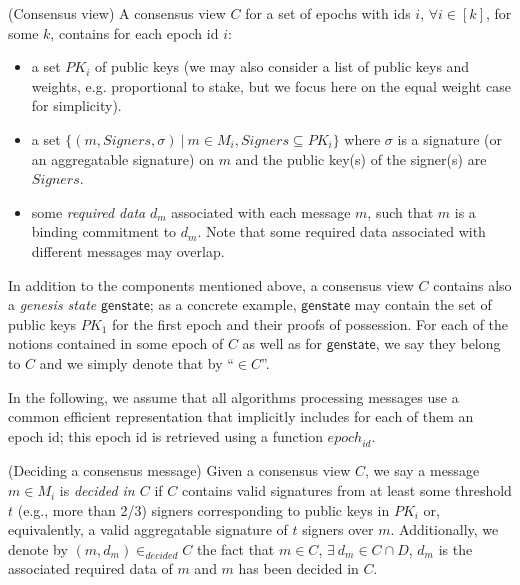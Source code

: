 \begin{dfn}(Consensus view) A consensus view $C$ for a set of epochs with ids $i$, $\forall i \in [k]$, 
for some $k$, contains for each epoch id $i$:
\begin{itemize}
\item a set $PK_i$ of public keys (we may also consider a list of public keys and weights, e.g. proportional to stake, but we focus here on  
the equal weight case for simplicity). 
\item a set $\{(m, \mathit{Signers}, \sigma) \ | \ m \in M_i, \mathit{Signers} \subseteq PK_i\}$ where 
$\sigma$ is a signature (or an aggregatable signature) on $m$ and the public key(s) of the signer(s) are $\mathit{Signers}$. 
\item some \textit{required data} $d_{m}$ associated with each message $m$, such that $m$ is a binding commitment to $d_{m}$. Note 
that some required data associated with different messages may overlap. 
\end{itemize}
In addition to the components mentioned above, a consensus view $C$ contains also a \emph{genesis state} $\mathsf{genstate}$; as a concrete example,
$\mathsf{genstate}$ may contain the set of public keys $\mathit{PK_1}$ for the first epoch and their proofs of possession. For each of the notions 
contained in some epoch of $C$ as well as for $\mathsf{genstate}$, we say they belong to $C$ and we simply denote that by ``$\in C$''. 
\end{dfn}

\noindent In the following, we assume that all algorithms processing messages use a common efficient representation that implicitly 
includes for each of them an epoch id; this epoch id is retrieved using a function $\mathit{epoch}_{\mathit{id}}$. 

\begin{dfn}(Deciding a consensus message) 
\label{def_decide}
Given a consensus view $C$, we say a message $m \in M_i$ is \emph{decided in $C$} 
if $C$ contains valid signatures from at least some threshold $t$ (e.g., more than 2/3) 
signers corresponding to public keys in $PK_i$ or, equivalently, a valid aggregatable 
signature of $t$ signers over $m$. Additionally, we denote by $(\mathit{m}, d_{\mathit{m}}) \in_{\mathit{decided}} C$ 
the fact that $m \in C$, $ \exists \ d_m \in C \cap D$, $d_m$ is the associated required data of $m$ and $m$ has been decided in $C$.  
\end{dfn}

